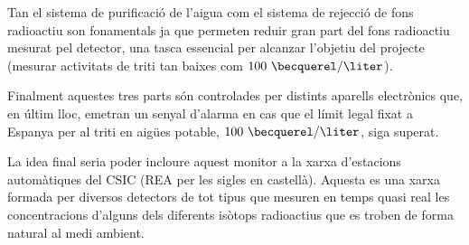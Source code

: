 Tan el sistema de purificació de l'aigua com el sistema de rejecció de fons radioactiu son fonamentals ja que permeten reduir gran part del fons radioactiu mesurat pel detector, una tasca essencial per alcanzar l'objetiu del projecte (mesurar activitats de triti tan baixes com $100~\becquerel/\liter$).

Finalment aquestes tres parts són controlades per distints aparells electrònics que, en últim lloc, emetran un senyal d'alarma en cas que el límit legal fixat a Espanya per al triti en aigües potable, $100~\becquerel/\liter$, siga superat.

La idea final seria poder incloure aquest monitor a la xarxa d'estacions automàtiques del CSIC\cite{REA} (REA per les sigles en castellà). Aquesta es una xarxa formada per diversos detectors de tot tipus que mesuren en temps quasi real les concentracions d'alguns dels diferents isòtops radioactius que es troben de forma natural al medi ambient. 